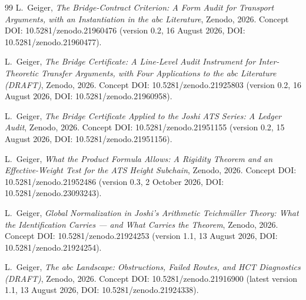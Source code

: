 \documentclass[11pt,a4paper]{article}
\theoremstyle{definition}
\theoremstyle{remark}
\begin{document}
\begin{thebibliography}{99}
L.~Geiger,
\emph{The Bridge-Contract Criterion: A Form Audit for Transport Arguments,
with an Instantiation in the abc Literature},
Zenodo, 2026.
Concept DOI: 10.5281/zenodo.21960476
(version 0.2, 16 August 2026, DOI: 10.5281/zenodo.21960477).

L.~Geiger,
\emph{The Bridge Certificate: A Line-Level Audit Instrument for
Inter-Theoretic Transfer Arguments, with Four Applications to the abc
Literature (DRAFT)},
Zenodo, 2026.
Concept DOI: 10.5281/zenodo.21925803
(version 0.2, 16 August 2026, DOI: 10.5281/zenodo.21960958).

L.~Geiger,
\emph{The Bridge Certificate Applied to the Joshi ATS Series: A Ledger
Audit},
Zenodo, 2026.
Concept DOI: 10.5281/zenodo.21951155
(version 0.2, 15 August 2026, DOI: 10.5281/zenodo.21951156).

L.~Geiger,
\emph{What the Product Formula Allows: A Rigidity Theorem and an
Effective-Weight Test for the ATS Height Subchain},
Zenodo, 2026.
Concept DOI: 10.5281/zenodo.21952486
(version 0.3, 2 October 2026, DOI: 10.5281/zenodo.23093243).

L.~Geiger,
\emph{Global Normalization in Joshi's Arithmetic Teichm\"{u}ller Theory: What
the Identification Carries --- and What Carries the Theorem},
Zenodo, 2026.
Concept DOI: 10.5281/zenodo.21924253
(version 1.1, 13 August 2026, DOI: 10.5281/zenodo.21924254).

L.~Geiger,
\emph{The abc Landscape: Obstructions, Failed Routes, and HCT Diagnostics
(DRAFT)},
Zenodo, 2026.
Concept DOI: 10.5281/zenodo.21916900
(latest version 1.1, 13 August 2026, DOI: 10.5281/zenodo.21924338).

\end{thebibliography}
\end{document}
